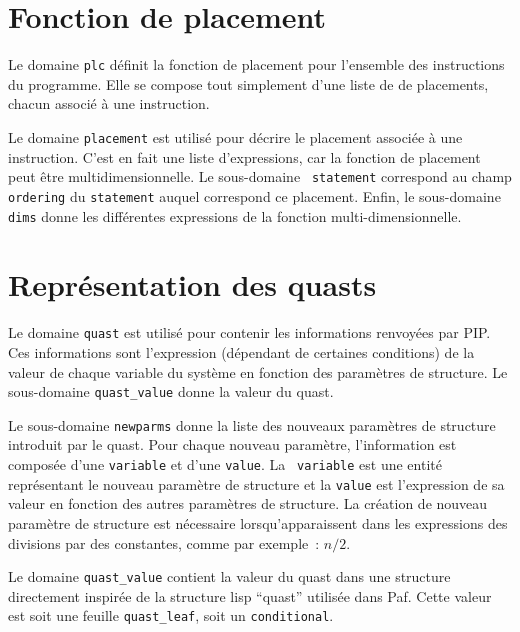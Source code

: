 \documentclass{article}
\begin{document}
\section{Fonction de placement}

{Le domaine {\tt plc} d\'efinit la fonction de placement pour l'ensemble des 
instructions du programme. Elle se compose tout simplement d'une liste de de 
placements, chacun associ\'e \`a une instruction.}

{Le domaine {\tt placement} est utilis\'e pour d\'ecrire le placement 
associ\'ee \`a une instruction. C'est en fait une liste d'expressions, car la 
fonction de placement peut \^etre multidimensionnelle. Le sous-domaine {\tt 
statement} correspond au champ {\tt ordering} du {\tt statement} auquel 
correspond ce placement. Enfin, le sous-domaine {\tt dims} donne les 
diff\'erentes expressions de la fonction multi-dimensionnelle.}

\section{Repr\'esentation des quasts}

{Le domaine {\tt quast} est utilis\'e pour contenir les informations 
renvoy\'ees par PIP. Ces informations sont l'expression (d\'ependant de 
certaines conditions) de la valeur de chaque variable du syst\`eme en fonction 
des param\`etres de structure. Le sous-domaine {\tt quast\_value} donne la 
valeur du quast.

Le sous-domaine {\tt newparms} donne la liste des nouveaux param\`etres de 
structure introduit par le quast. Pour chaque nouveau param\`etre, 
l'information est compos\'ee d'une {\tt variable} et d'une {\tt value}. La {\tt
variable} est une entit\'e repr\'esentant le nouveau param\`etre de structure 
et la {\tt value} est l'expression de sa valeur en fonction des autres 
param\`etres de structure. La cr\'eation de nouveau param\`etre de structure 
est n\'ecessaire lorsqu'apparaissent dans les expressions des divisions par des
constantes, comme par exemple~: \( n/2\).}

{Le domaine {\tt quast\_value} contient la valeur du quast dans une structure 
directement inspir\'ee de la structure lisp ``quast'' utilis\'ee dans Paf. 
Cette valeur est soit une feuille {\tt quast\_leaf},
soit un {\tt conditional}.}
\end{document}
